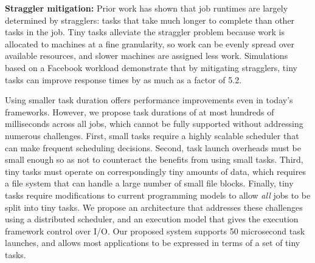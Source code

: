\noindent\textbf{Straggler mitigation:}
Prior work has shown that job runtimes are largely determined by
stragglers: tasks that take much longer to complete than other tasks in the
job.
Tiny tasks alleviate the straggler problem because work is allocated to
machines at a fine granularity, so work can be evenly spread
over available resources, and slower machines are assigned
less work. Simulations based on a Facebook workload
demonstrate that by mitigating stragglers, tiny tasks
can improve response times by as much as a factor of 5.2.


Using smaller task duration offers performance improvements even in
today's frameworks.  However, we propose task durations of at most
hundreds of milliseconds across all jobs, which cannot be fully supported without addressing
numerous challenges. First, small tasks require a highly scalable scheduler
that can make frequent scheduling decisions. Second,
task launch overheads must be small enough so as not to counteract the
benefits from using small tasks.
Third, tiny tasks must operate on correspondingly tiny amounts
of data, which requires a file system that can handle a large number of 
small file blocks. Finally, tiny tasks require modifications to current programming
models to allow \emph{all} jobs to be split into tiny tasks. We propose an
architecture that addresses these challenges using a distributed scheduler, and an execution model that gives the execution framework control
over I/O. Our proposed system supports
50 microsecond task launches, and allows most applications to be
expressed in terms of a set of tiny tasks.


